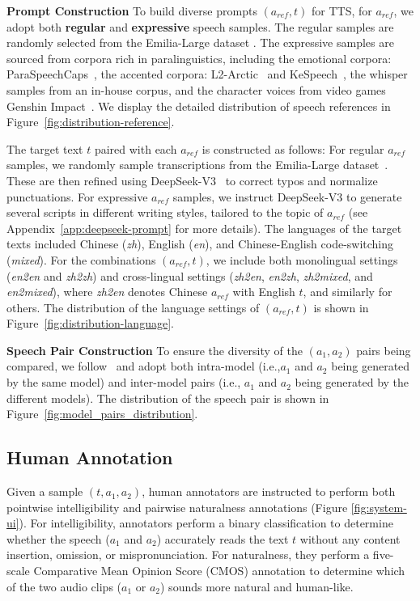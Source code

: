 \documentclass[]{bytedance_seed}
\begin{document}
\textbf{Prompt Construction}\quad
To build diverse prompts $(a_{ref}, t)$ for TTS, for $a_{ref}$, we adopt both \textbf{regular} and \textbf{expressive} speech samples. The regular samples are randomly selected from the Emilia-Large dataset \citep{emilia-large}. The expressive samples are sourced from corpora rich in paralinguistics, including the emotional corpora: ParaSpeechCaps~\citep{paraspeechcaps}, the accented corpora: L2-Arctic~\citep{l2arctic} and KeSpeech~\citep{kespeech}, the whisper samples from an in-house corpus, and the character voices from video games Genshin Impact~\citep{genshin}. We display the detailed distribution of speech references in Figure~\ref{fig:distribution-reference}.

The target text $t$ paired with each $a_{ref}$ is constructed as follows: For regular $a_{ref}$ samples, we randomly sample transcriptions from the Emilia-Large dataset~\citep{emilia-large}. These are then refined using DeepSeek-V3~\citep{deepseek-v3} to correct typos and normalize punctuations. For expressive $a_{ref}$ samples, we instruct DeepSeek-V3 to generate several scripts in different writing styles, tailored to the topic of $a_{ref}$ (see Appendix~\ref{app:deepseek-prompt} for more details). The languages of the target texts included Chinese (\textit{zh}), English (\textit{en}), and Chinese-English code-switching (\textit{mixed}). For the combinations $(a_{ref}, t)$, we include both monolingual settings (\textit{en2en} and \textit{zh2zh}) and cross-lingual settings (\textit{zh2en}, \textit{en2zh}, \textit{zh2mixed}, and \textit{en2mixed}), where \textit{zh2en} denotes Chinese $a_{ref}$ with English $t$, and similarly for others. The distribution of the language settings of $(a_{ref}, t)$ is shown in Figure~\ref{fig:distribution-language}.

\textbf{Speech Pair Construction}\quad
To ensure the diversity of the $(a_1, a_2)$ pairs being compared, we follow~\citet{intp} and adopt both intra-model (i.e.,$a_1$ and $a_2$ being generated by the same model) and inter-model pairs (i.e., $a_1$ and $a_2$ being generated by the different models). The distribution of the speech pair is shown in Figure~\ref{fig:model_pairs_distribution}.


\subsection{Human Annotation}
Given a sample $(t, a_1, a_2)$, human annotators are instructed to perform both pointwise intelligibility and pairwise naturalness annotations (Figure \ref{fig:system-ui}). For intelligibility, annotators perform a binary classification to determine whether the speech ($a_1$ and $a_2$) accurately reads the text $t$ without any content insertion, omission, or mispronunciation. For naturalness, they perform a five-scale Comparative Mean Opinion Score (CMOS) annotation to determine which of the two audio clips ($a_1$ or $a_2$) sounds more natural and human-like. 
\end{document}
